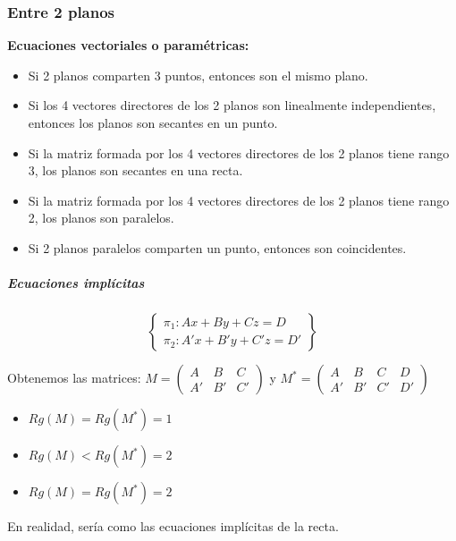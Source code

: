 \subsubsection{Entre 2 planos}  

\begin{framed}
\textbf{Ecuaciones vectoriales o paramétricas:}
  \begin{itemize}
    \item Si 2 planos comparten 3 puntos, entonces son el mismo plano.
    \item Si los 4 vectores directores de los 2 planos son linealmente independientes, entonces los planos son secantes en un punto.
    \item Si la matriz formada por los 4 vectores directores de los 2 planos tiene rango 3, los planos son secantes en una recta.
    \item Si la matriz formada por los 4 vectores directores de los 2 planos tiene rango 2, los planos son paralelos.
    \item Si 2 planos paralelos comparten un punto, entonces son coincidentes.
  \end{itemize}
\end{framed}



\subparagraph{Ecuaciones implícitas}

\[
\left\{\begin{array}{c}
\pi_1: Ax+By+Cz = D\\
\pi_2: A'x+B'y+C'z = D'
\end{array}\right\}
\]

Obtenemos las matrices: $M = \displaystyle\begin{pmatrix}A&B&C\\A'&B'&C'\end{pmatrix}$ y $M^* = \displaystyle\begin{pmatrix}A&B&C&D\\A'&B'&C'&D'\end{pmatrix}$

\begin{framed}
  \begin{itemize}
    \item $Rg(M) = Rg(M^*) = 1 $
    \item $Rg(M) < Rg(M^*) = 2 $
    \item $Rg(M) = Rg(M^*) = 2 $
  \end{itemize}
\obs En realidad, sería como las ecuaciones implícitas de la recta.
\end{framed}

